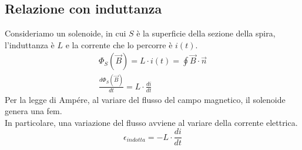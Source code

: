 \subsection{Relazione con induttanza}
Consideriamo un solenoide, in cui $S$ è la superficie della sezione della spira, l'induttanza è $L$ e la corrente che lo percorre è $i(t)$. \
\begin{displaymath}\begin{aligned}
	\Phi_S (\vec{B}) = L \cdot i(t) = \oint \vec{B} \cdot \vec{n}\\
    \frac{d\Phi_S (\vec{B})}{dt} = L \cdot \frac{di}{dt}
\end{aligned}\end{displaymath}
Per la legge di Ampére, al variare del flusso del campo magnetico, il solenoide genera una fem.\\
In particolare, una variazione del flusso avviene al variare della corrente elettrica.
\begin{displaymath}
	\epsilon_{indotta} = -L \cdot \frac{di}{dt}
\end{displaymath}